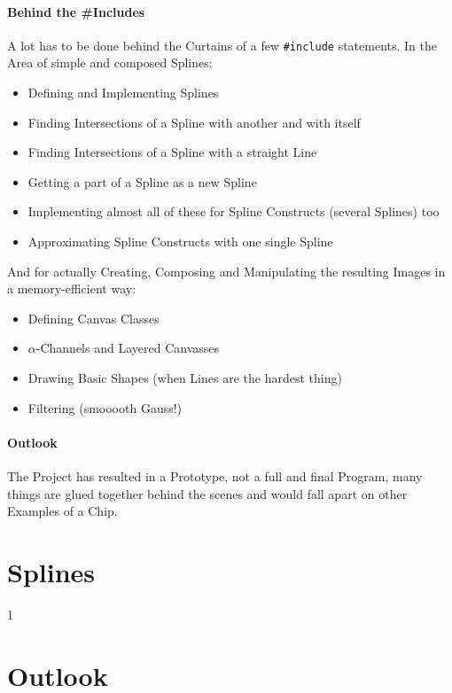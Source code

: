 \documentclass[10pt]{article}
\newcommand\behindIncludes{1}
\begin{document}
\paragraph{Behind the \#Includes}
	A lot has to be done behind the Curtains of a few {\tt \#include} statements.
	In the Area of simple and composed Splines:
	\begin{itemize}
		\item Defining and Implementing Splines
		\item Finding Intersections of a Spline with another and with itself
		\item Finding Intersections of a Spline with a straight Line
		\item Getting a part of a Spline as a new Spline
		\item Implementing almost all of these for Spline Constructs (several Splines) too
		\item Approximating Spline Constructs with one single Spline
	\end{itemize}
	And for actually Creating, Composing and Manipulating the resulting Images in a memory-efficient way:
	\begin{itemize}
		\item Defining Canvas Classes
		\item $\alpha$-Channels and Layered Canvasses
		\item Drawing Basic Shapes (when Lines are the hardest thing)
		\item Filtering (smooooth Gauss!)
	\end{itemize}
\paragraph{Outlook}
	The Project has resulted in a Prototype, not a full and final Program, many things are glued together behind the scenes and would fall apart on other Examples of a Chip.
\section{Splines}
	
	\if\behindIncludes1
		
	\fi



\section{Outlook}
\end{document}
